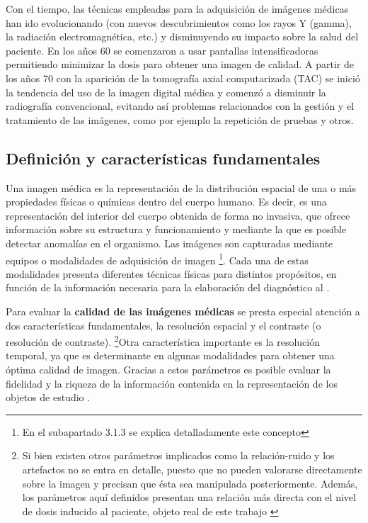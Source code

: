 Con el tiempo, las técnicas empleadas para la adquisición de imágenes médicas han ido evolucionando (con nuevos descubrimientos como los rayos Y (gamma), la radiación electromagnética, etc.) y disminuyendo su impacto sobre la salud del paciente. En los años 60 se comenzaron a usar pantallas intensificadoras permitiendo minimizar la dosis para obtener una imagen de calidad. A partir de los años 70 con la aparición de la tomografía axial computarizada (TAC) se inició la tendencia del uso de la imagen digital médica y comenzó a disminuir la radiografía convencional, evitando así problemas relacionados con la gestión y el tratamiento de las imágenes, como por ejemplo la repetición de pruebas y otros.

\subsection{Definición y características fundamentales}
Una imagen médica es la representación de la distribución espacial de una o más propiedades físicas o químicas dentro del cuerpo humano. Es decir, es una representación del interior del cuerpo obtenida de forma no invasiva, que ofrece información sobre su estructura y funcionamiento y mediante la que es posible detectar anomalías en el organismo. Las imágenes son capturadas mediante equipos o modalidades de adquisición de imagen \footnote{En el subapartado 3.1.3 se explica detalladamente este concepto}. Cada una de estas modalidades presenta diferentes técnicas físicas para distintos propósitos, en función de la información necesaria para la elaboración del diagnóstico al \cite{5}.

Para evaluar la \textbf{calidad de las imágenes médicas} se presta especial atención a dos características fundamentales, la resolución espacial y el contraste (o resolución de contraste). \footnote{Si bien existen otros parámetros implicados como la relación-ruido y los artefactos no se entra en detalle, puesto que no pueden valorarse directamente sobre la imagen y precisan que ésta sea manipulada posteriormente. Además, los parámetros aquí definidos presentan una relación más directa con el nivel de dosis inducido al paciente, objeto real de este trabajo \cite{6}}Otra característica importante es la resolución temporal, ya que es determinante en algunas modalidades para obtener una óptima calidad de imagen. Gracias a estos parámetros es posible evaluar la fidelidad y la riqueza de la información contenida en la representación de los objetos de estudio \cite{6} \cite{7}.

